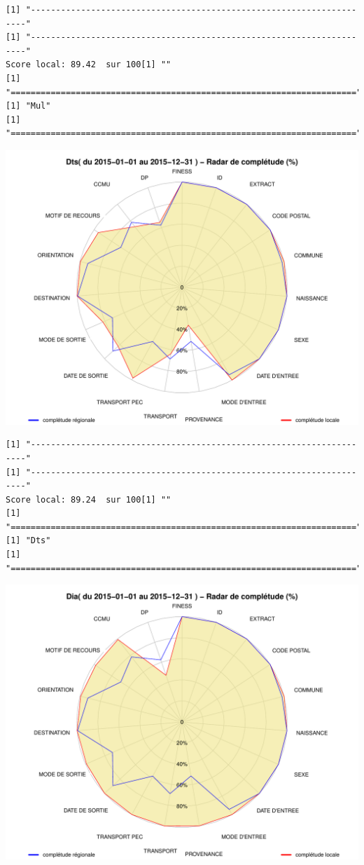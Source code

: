 \documentclass[]{article}
\begin{document}
\begin{verbatim}
[1] "---------------------------------------------------------------------"
[1] "---------------------------------------------------------------------"
Score local: 89.42  sur 100[1] ""
[1] "====================================================================="
[1] "Mul"
[1] "====================================================================="
\end{verbatim}

\includegraphics{completude_files/figure-latex/finess-4.pdf}

\begin{verbatim}
[1] "---------------------------------------------------------------------"
[1] "---------------------------------------------------------------------"
Score local: 89.24  sur 100[1] ""
[1] "====================================================================="
[1] "Dts"
[1] "====================================================================="
\end{verbatim}

\includegraphics{completude_files/figure-latex/finess-5.pdf}
\end{document}
